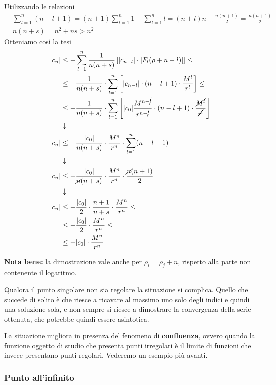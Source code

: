 \begin{enumerate}
	Utilizzando le relazioni
	\begin{align}
		&\sum_{l=1}^{n} (n-l+1) = (n+1)\sum_{l=1}^{n} 1 - \sum_{l=1}^{n}l = (n+l)n - \frac{n(n+1)}{2} = \frac{n(n+1)}{2}\\
		&n(n+s) = n^2 + ns > n^2
	\end{align}	
	Otteniamo così la tesi
	\begin{align}
		|c_n| &\leq -\sum_{l=1}^{n} \frac{1}{n(n+s)} \left[|c_{n-l}| \cdot |F_l (\rho + n -l )| \right] \leq \nonumber \\
			  &\leq - \frac{1}{n(n+s)} \cdot \sum_{l=1}^{n}  \left[|c_{n-l}| \cdot (n-l+1) \cdot \frac{M^l}{r^l}	 \right] \leq \nonumber \\
			  &\leq - \frac{1}{n(n+s)} \cdot \sum_{l=1}^{n}  \left[ |c_0|\frac{M^{n-\cancel{l}}}{r^{n-\cancel{l}}} \cdot (n-l+1) \cdot \frac{\cancel{M^l}}{\cancel{r^l}}	 \right] \\ &\downarrow \nonumber \\
		|c_n| &\leq - \frac{|c_0|}{n(n+s)}\cdot \frac{M^n}{r^n} \cdot \sum_{l=1}^{n}(n-l+1) \\ &\downarrow \nonumber \\
		|c_n| &\leq - \frac{|c_0|}{\cancel{n}(n+s)}\cdot \frac{M^n}{r^n}\cdot \frac{\cancel{n}(n+1)}{2}\\ &\downarrow \nonumber \\
		|c_n| &\leq - \frac{|c_0|}{2}\cdot \frac{n+1}{n+s}\cdot \frac{M^n}{r^n} \leq \nonumber\\
			  &\leq - \frac{|c_0|}{2}\cdot \frac{M^n}{r^n} \leq \nonumber\\
			  &\leq - |c_0|\cdot \frac{M^n}{r^n}
	\end{align}
\end{enumerate}

\textbf{Nota bene:} la dimostrazione vale anche per $\rho_i = \rho_j + n$, rispetto alla parte non contenente il logaritmo.

Qualora il punto singolare non sia regolare la situazione si complica. Quello che succede di solito è che riesce a ricavare al massimo uno solo degli indici e quindi una soluzione sola, e non sempre si riesce a dimostrare la convergenza della serie ottenuta, che potrebbe quindi essere asintotica.

La situazione migliora in presenza del fenomeno di \textbf{confluenza}, ovvero quando la funzione oggetto di studio che presenta punti irregolari è il limite di funzioni che invece presentano punti regolari. Vederemo un esempio più avanti.

\newpage

\subsubsection{Punto all'infinito}

